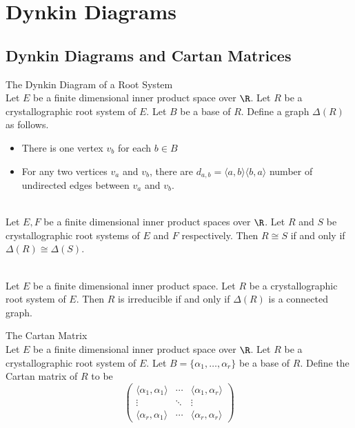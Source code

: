 \documentclass[a4paper]{article}
\begin{document}
\pagebreak
\section{Dynkin Diagrams}
\subsection{Dynkin Diagrams and Cartan Matrices}
\begin{defn}{The Dynkin Diagram of a Root System}{} \\Let $E$ be a finite dimensional inner product space over $\R$. Let $R$ be a crystallographic root system of $E$. Let $B$ be a base of $R$. Define a graph $\Delta(R)$ as follows. 
\begin{itemize}
\item There is one vertex $v_b$ for each $b\in B$
\item For any two vertices $v_a$ and $v_b$, there are $d_{a,b}=\langle a,b\rangle\langle b,a\rangle$ number of undirected edges between $v_a$ and $v_b$. 
\end{itemize}
\end{defn}

\begin{prp}{}{} \\Let $E,F$ be a finite dimensional inner product spaces over $\R$. Let $R$ and $S$ be crystallographic root systems of $E$ and $F$ respectively. Then $R\cong S$ if and only if $\Delta(R)\cong\Delta(S)$. 
\end{prp}

\begin{prp}{}{} \\Let $E$ be a finite dimensional inner product space. Let $R$ be a crystallographic root system of $E$. Then $R$ is irreducible if and only if $\Delta(R)$ is a connected graph. 
\end{prp}

\begin{defn}{The Cartan Matrix}{} \\Let $E$ be a finite dimensional inner product space over $\R$. Let $R$ be a crystallographic root system of $E$. Let $B=\{\alpha_1,\dots,\alpha_r\}$ be a base of $R$. Define the Cartan matrix of $R$ to be $$\begin{pmatrix}
\langle\alpha_1,\alpha_1\rangle & \cdots & \langle\alpha_1,\alpha_r\rangle\\
\vdots & \ddots & \vdots\\
\langle\alpha_r,\alpha_1\rangle & \cdots & \langle\alpha_r,\alpha_r\rangle
\end{pmatrix}$$
\end{defn}
\end{document}
